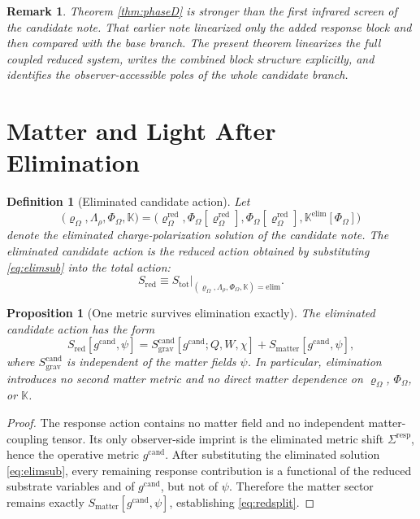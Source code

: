 \documentclass[11pt]{article}
\newcommand{\CandidateMetric}{g^{\mathrm{cand}}}
\newcommand{\ResponseShift}{\Sigma^{\mathrm{resp}}}
\newcommand{\AuxPol}{\mathbb K}
\newcommand{\FlowPot}{\Phi_\Omega}
\newcommand{\SourceDensity}{\varrho_\Omega}
\newcommand{\SourceDensityRed}{\varrho_\Omega^{\mathrm{red}}}
\newcommand{\SourceMult}{\Lambda_\rho}
\newcommand{\MatterAct}{S_{\mathrm{matter}}}
\newcommand{\TotalAct}{S_{\mathrm{tot}}}
\newcommand{\RedAct}{S_{\mathrm{red}}}
\newtheorem{definition}{Definition}
\newtheorem{proposition}{Proposition}
\newtheorem{remark}{Remark}
\begin{document}
\begin{remark}
Theorem \ref{thm:phaseD} is stronger than the first infrared screen of the candidate note. That earlier note linearized only the added response block and then compared with the base branch. The present theorem linearizes the full coupled reduced system, writes the combined block structure explicitly, and identifies the observer-accessible poles of the whole candidate branch.
\end{remark}

\section{Matter and Light After Elimination}

\begin{definition}[Eliminated candidate action]
\label{def:redaction}
Let
\begin{equation}
\bigl(
\SourceDensity,\SourceMult,\FlowPot,\AuxPol
\bigr)
=
\bigl(
\SourceDensityRed,\FlowPot[\SourceDensityRed],\FlowPot[\SourceDensityRed],\AuxPol^{\mathrm{elim}}[\FlowPot]
\bigr)
\label{eq:elimsub}
\end{equation}
denote the eliminated charge-polarization solution of the candidate note. The \emph{eliminated candidate action} is the reduced action obtained by substituting \eqref{eq:elimsub} into the total action:
\begin{equation}
\RedAct
\equiv
\TotalAct\Big|_{(\SourceDensity,\SourceMult,\FlowPot,\AuxPol)=\mathrm{elim}}.
\label{eq:redaction}
\end{equation}
\end{definition}

\begin{proposition}[One metric survives elimination exactly]
\label{prop:one}
The eliminated candidate action has the form
\begin{equation}
\RedAct[\CandidateMetric,\psi]
=
S_{\mathrm{grav}}^{\mathrm{cand}}[\CandidateMetric;Q,W,\chi]
+
\MatterAct[\CandidateMetric,\psi],
\label{eq:redsplit}
\end{equation}
where \(S_{\mathrm{grav}}^{\mathrm{cand}}\) is independent of the matter fields \(\psi\). In particular, elimination introduces no second matter metric and no direct matter dependence on \(\SourceDensity\), \(\FlowPot\), or \(\AuxPol\).
\end{proposition}

\begin{proof}
The response action contains no matter field and no independent matter-coupling tensor. Its only observer-side imprint is the eliminated metric shift \(\ResponseShift\), hence the operative metric \(\CandidateMetric\). After substituting the eliminated solution \eqref{eq:elimsub}, every remaining response contribution is a functional of the reduced substrate variables and of \(\CandidateMetric\), but not of \(\psi\). Therefore the matter sector remains exactly \(\MatterAct[\CandidateMetric,\psi]\), establishing \eqref{eq:redsplit}.
\end{proof}
\end{document}
